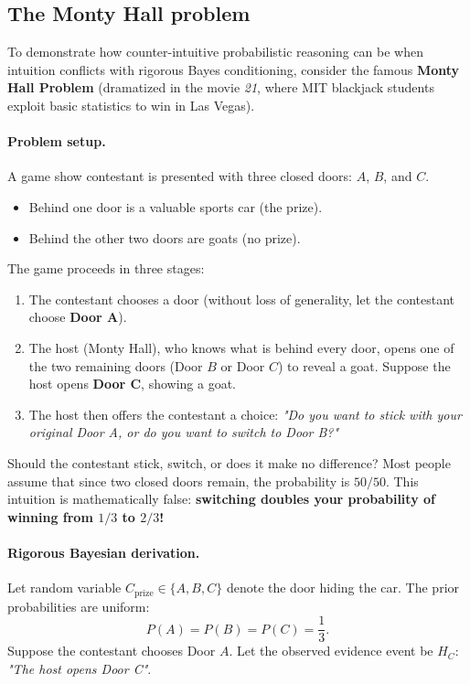 \subsection{The Monty Hall problem}
\label{sec:monty_hall_problem}

To demonstrate how counter-intuitive probabilistic reasoning can be when intuition conflicts with rigorous Bayes conditioning, consider the famous \textbf{Monty Hall Problem} (dramatized in the movie \emph{21}, where MIT blackjack students exploit basic statistics to win in Las Vegas).

\paragraph{Problem setup.}
A game show contestant is presented with three closed doors: $A$, $B$, and $C$.
\begin{itemize}[noitemsep]
  \item Behind one door is a valuable sports car (the prize).
  \item Behind the other two doors are goats (no prize).
\end{itemize}
The game proceeds in three stages:
\begin{enumerate}[noitemsep]
  \item The contestant chooses a door (without loss of generality, let the contestant choose \textbf{Door A}).
  \item The host (Monty Hall), who knows what is behind every door, opens one of the two remaining doors (Door $B$ or Door $C$) to reveal a goat. Suppose the host opens \textbf{Door C}, showing a goat.
  \item The host then offers the contestant a choice: \emph{"Do you want to stick with your original Door A, or do you want to switch to Door B?"}
\end{enumerate}
Should the contestant stick, switch, or does it make no difference? Most people assume that since two closed doors remain, the probability is $50/50$. This intuition is mathematically false: \textbf{switching doubles your probability of winning from $1/3$ to $2/3$!}

\paragraph{Rigorous Bayesian derivation.}
Let random variable $C_{\text{prize}} \in \{A, B, C\}$ denote the door hiding the car. The prior probabilities are uniform:
\begin{equation}
P(A) = P(B) = P(C) = \frac{1}{3}.
\end{equation}
Suppose the contestant chooses Door $A$. Let the observed evidence event be $H_C$: \emph{"The host opens Door C"}.

